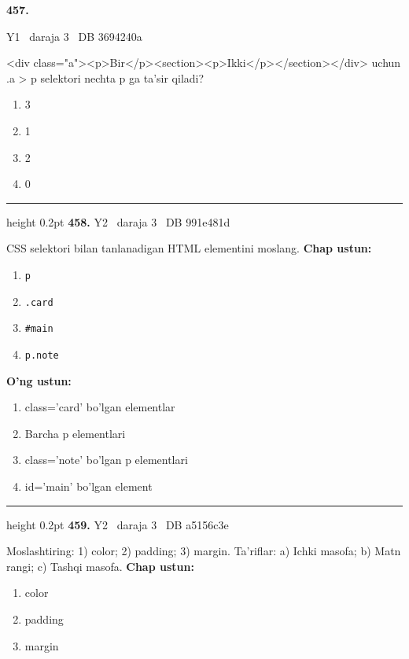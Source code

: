 \documentclass[10pt,a4paper,oneside]{article}
\begin{document}
\hypertarget{q457}{\textbf{\color{ink}457.}}  {\color{muted}\scriptsize Y1 \textbullet\ daraja 3 \textbullet\ DB 3694240a}
\par
\textless{}div class="a"\textgreater{}\textless{}p\textgreater{}Bir\textless{}/p\textgreater{}\textless{}section\textgreater{}\textless{}p\textgreater{}Ikki\textless{}/p\textgreater{}\textless{}/section\textgreater{}\textless{}/div\textgreater{} uchun .a \textgreater{} p selektori nechta p ga ta'sir qiladi?
\begin{enumerate}[label=\Alph*),leftmargin=9mm]
\item 3
\item 1
\item 2
\item 0
\end{enumerate}
\vspace{2mm}\hrule height 0.2pt \vspace{4mm}
\hypertarget{q458}{\textbf{\color{ink}458.}}  {\color{muted}\scriptsize Y2 \textbullet\ daraja 3 \textbullet\ DB 991e481d}
\par
CSS selektori bilan tanlanadigan HTML elementini moslang.
\textbf{\footnotesize Chap ustun:}
\begin{enumerate}[label=\arabic*),leftmargin=9mm]
\item \texttt{p}
\item \texttt{.card}
\item \texttt{\#main}
\item \texttt{p.note}
\end{enumerate}
\textbf{\footnotesize O'ng ustun:}
\begin{enumerate}[label=\Alph*),leftmargin=9mm]
\item class='card' bo'lgan elementlar
\item Barcha p elementlari
\item class='note' bo'lgan p elementlari
\item id='main' bo'lgan element
\end{enumerate}
\vspace{2mm}\hrule height 0.2pt \vspace{4mm}
\hypertarget{q459}{\textbf{\color{ink}459.}}  {\color{muted}\scriptsize Y2 \textbullet\ daraja 3 \textbullet\ DB a5156c3e}
\par
Moslashtiring: 1) color; 2) padding; 3) margin. Ta'riflar: a) Ichki masofa; b) Matn rangi; c) Tashqi masofa.
\textbf{\footnotesize Chap ustun:}
\begin{enumerate}[label=\arabic*),leftmargin=9mm]
\item color
\item padding
\item margin
\end{enumerate}
\end{document}
